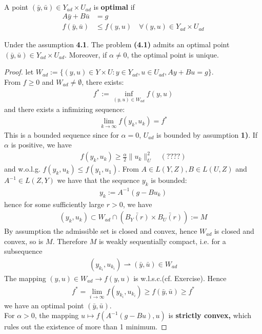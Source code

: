 \quad\\
A point $(\bar{y}, \bar{u}) \in Y_{ad} \times U_{ad}$ is \textbf{optimal} if 
\begin{align*}
	A\bar{y} + B \bar{u} &= g\\
	f(\bar{y}, \bar{u}) &\le f(y, u) \quad \forall (y, u) \in Y_{ad} \times U_{ad}
\end{align*}

\begin{theorem}
	Under the assumption \textbf{4.1}.  The problem \textbf{(4.1)} admits an optimal point $(\bar{y}, \bar{u}) \in Y_{ad} \times U_{ad}$. Moreover, if $\alpha \neq 0$, the optimal point is unique. 
\end{theorem}
\begin{proof}
	let $W_{ad} := \{(y, u) \in Y \times U: y \in Y_{ad}, u \in U_{ad}, Ay + Bu = g\}$. \\
	From $f \ge 0$ and $W_{ad} \neq \emptyset$, there exists:
	\begin{align*}
		f^*:= \inf_{(y, u) \in W_{ad}} f(y, u)
	\end{align*}
	and there exists a infimizing sequence:
	\begin{align*}
		\lim_{ k\rightarrow \infty} f(y_k, u_k) = f^*
	\end{align*}
	This is a bounded sequence since for $\alpha = 0$, $U_{ad}$ is bounded by assumption \textbf{1)}. If $\alpha$ is positive, we have 
	\begin{align*}
		f(y_k, u_k) \geq \frac{\alpha}{2}\|u_k\|_U^2\quad (????)
	\end{align*}
	and w.o.l.g. $f(y_k, u_k) \le f(y_1, u_1)$. From $A \in L(Y, Z), B \in L(U, Z)$ and $A^{-1} \in L(Z, Y)$ we have that the sequence $y_k$ is bounded:
	\begin{align*}
		y_k:= A^{-1}(g - Bu_k)
	\end{align*}
	hence for some sufficiently large $r > 0$, we have
	\begin{align*}
		(y_k, u_k) \subset W_{ad} \cap (\bar{B_Y(r)} \times \bar{B_U(r)}):= M
	\end{align*}
	By assumption the admissible set is closed and convex, hence $W_{ad}$ is closed and convex, so is $M$. Therefore $M$ is weakly sequentially compact, i.e. for a subsequence
	\begin{align*}
		(y_{k_i}, u_{k_i}) \rightharpoonup (\bar{y}, \bar{u}) \in W_{ad}
	\end{align*}
	The mapping $(y, u) \in W_{ad} \rightarrow f(y, u)$ is w.l.s.c.(cf. Exercise). Hence
	\begin{align*}
		f^* = \lim_{i \rightarrow \infty} f(y_{k_i}, u_{k_i}) \geq f(\bar{y}, \bar{u}) \geq f^*
	\end{align*}
	we have an optimal point $(\bar{y}, \bar{u})$. \\
	For $\alpha > 0$, the mapping $u \mapsto f(A^{-1}(g - Bu), u)$ is \textbf{strictly convex,} which rules out the existence of more than 1 minimum. 
\end{proof}

